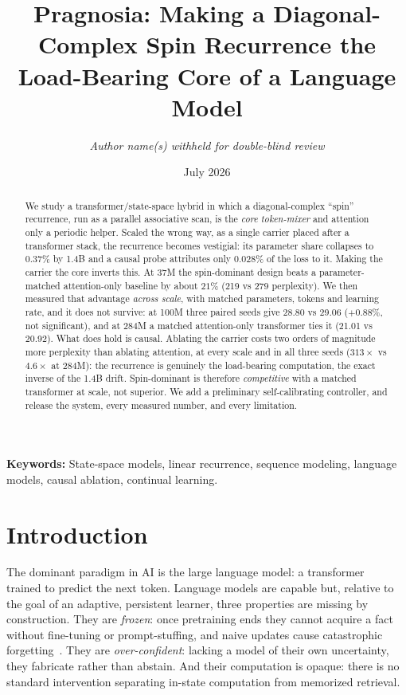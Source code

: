 \documentclass[10pt,twocolumn]{article}
\title{Pragnosia: Making a Diagonal-Complex Spin Recurrence the Load-Bearing Core of a Language Model}
\author{\normalsize\textit{Author name(s) withheld for double-blind review}}
\date{July 2026}
\begin{document}
\maketitle


\begin{abstract}
We study a transformer/state-space hybrid in which a diagonal-complex ``spin'' recurrence, run as a parallel associative scan, is the \emph{core token-mixer} and attention only a periodic helper. Scaled the wrong way, as a single carrier placed after a transformer stack, the recurrence becomes vestigial: its parameter share collapses to $0.37\%$ by 1.4B and a causal probe attributes only $0.028\%$ of the loss to it. Making the carrier the core inverts this. At 37M the spin-dominant design beats a parameter-matched attention-only baseline by about $21\%$ (219 vs 279 perplexity). We then measured that advantage \emph{across scale}, with matched parameters, tokens and learning rate, and it does not survive: at 100M three paired seeds give 28.80 vs 29.06 ($+0.88\%$, not significant), and at 284M a matched attention-only transformer ties it (21.01 vs 20.92). What does hold is causal. Ablating the carrier costs two orders of magnitude more perplexity than ablating attention, at every scale and in all three seeds ($313\times$ vs $4.6\times$ at 284M): the recurrence is genuinely the load-bearing computation, the exact inverse of the 1.4B drift. Spin-dominant is therefore \emph{competitive} with a matched transformer at scale, not superior. We add a preliminary self-calibrating controller, and release the system, every measured number, and every limitation.
\end{abstract}

\noindent\textbf{Keywords:} State-space models, linear recurrence, sequence modeling, language models, causal ablation, continual learning.

\section{Introduction}
The dominant paradigm in AI is the large language model: a transformer~\cite{vaswani2017} trained to predict the next token. Language models are capable but, relative to the goal of an adaptive, persistent learner, three properties are missing by construction. They are \emph{frozen}: once pretraining ends they cannot acquire a fact without fine-tuning or prompt-stuffing, and naive updates cause catastrophic forgetting~\cite{mccloskey1989}. They are \emph{over-confident}: lacking a model of their own uncertainty, they fabricate rather than abstain. And their computation is opaque: there is no standard intervention separating in-state computation from memorized retrieval.
\end{document}
